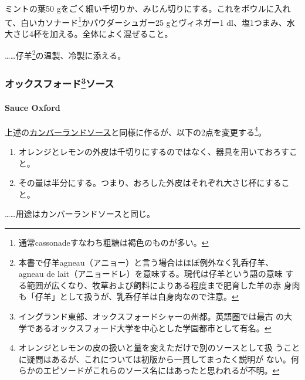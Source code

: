 \begin{recette}
ミントの葉50
gをごく細い千切りか、みじん切りにする。これをボウルに入れて、白いカソナード\footnote{通常cassonadeすなわち粗糖は褐色のものが多い。}かパウダーシュガー25
gとヴィネガー1\undemi{}
dl、塩1つまみ、水大さじ4杯を加える。全体によく混ぜること。

\ldots{}\ldots{}仔羊\footnote{本書で仔羊agneau（アニョー）と言う場合はほぼ例外なく乳呑仔羊、
  agneau de lait（アニョードレ）を意味する。現代は仔羊という語の意味
  する範囲が広くなり、牧草および飼料によりある程度まで肥育した羊の赤
  身肉も「仔羊」として扱うが、乳呑仔羊は白身肉なので注意。}の温製、冷製に添える。

\maeaki

\hypertarget{ux30aaux30c3ux30afux30b9ux30d5ux30a9ux30fcux30c965ux30bdux30fcux30b9}{%
\subsubsection[オックスフォードソース]{\texorpdfstring{オックスフォード\footnote{イングランド東部、オックスフォードシャーの州都。英語圏では最古
  の大学であるオックスフォード大学を中心とした学園都市として有名。}ソース}{オックスフォードソース}}\label{ux30aaux30c3ux30afux30b9ux30d5ux30a9ux30fcux30c965ux30bdux30fcux30b9}}

\hypertarget{sauce-oxford}{%
\paragraph{Sauce Oxford}\label{sauce-oxford}}

上述の\protect\hyperlink{cumberland-sauce}{カンバーランドソース}と同様に作るが、以下の2点を変更する\footnote{オレンジとレモンの皮の扱いと量を変えただけで別のソースとして扱
  うことに疑問はあるが、これについては初版から一貫してまったく説明が
  ない。何らかのエピソードがこれらのソース名にはあったと思われるが不明。}。

\begin{enumerate}
\def\labelenumi{\arabic{enumi}.}
\item
  オレンジとレモンの外皮は千切りにするのではなく、器具を用いておろすこと。
\item
  その量は半分にする。つまり、おろした外皮はそれぞれ大さじ\undemi{}杯にすること。
\end{enumerate}

\ldots{}\ldots{}用途はカンバーランドソースと同じ。

\maeaki

\hypertarget{ux30dbux30fcux30b9ux30e9ux30c7ux30a3ux30c3ux30b7ux30e5ux30bdux30fcux30b9}{%
}
\end{recette}
